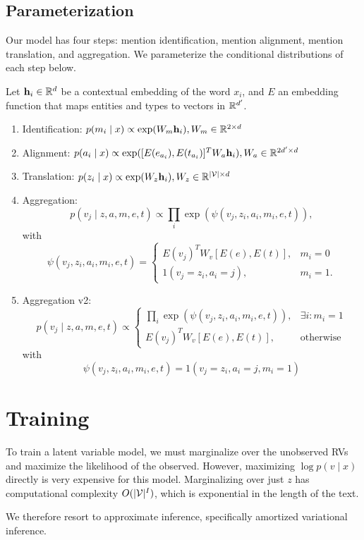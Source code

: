 \documentclass[12pt]{article}
\begin{document}
\subsection{Parameterization}
Our model has four steps: mention identification, mention alignment, 
mention translation, and aggregation.
We parameterize the conditional distributions of each step below.

Let $\mathbf{h}_i \in \mathbb{R}^d$ be a contextual embedding of the word $x_i$,
and $E$ an embedding function that maps entities and types
to vectors in $\mathbb{R}^{d'}$.
\begin{enumerate}
\item Identification: $p(m_i \mid x) \propto \exp(W_m\mathbf{h}_i), W_m \in \mathbb{R}^{2 \times d}$
\item Alignment: $p(a_i \mid x) \propto \exp([E(e_{a_i}), E(t_{a_i})]^TW_a \mathbf{h}_i),
W_a \in \mathbb{R}^{2d' \times d}$ 
\item Translation: $p(z_i \mid x) \propto \exp(W_z \mathbf{h}_i), W_z \in \mathbb{R}^{|\mathcal{V}| \times d}$
\item Aggregation: 
$$p(v_j \mid z,a,m,e,t) \propto \prod_i \exp(\psi(v_j, z_i, a_i, m_i,e,t)),$$
with
$$
\psi(v_j, z_i, a_i, m_i,e,t) = \begin{cases}
E(v_j)^TW_v [E(e),E(t)], & m_i = 0 \\
1(v_j = z_i, a_i = j), & m_i = 1.
\end{cases}
$$
\item Aggregation v2: 
$$p(v_j \mid z,a,m,e,t) \propto \begin{cases}
\prod_i \exp(\psi(v_j, z_i, a_i, m_i,e,t)), & \exists i: m_i = 1\\
E(v_j)^TW_v [E(e),E(t)], & \mathrm{otherwise}
\end{cases}
$$
with
$$
\psi(v_j, z_i, a_i, m_i,e,t) = 1(v_j = z_i, a_i = j, m_i=1)
$$
\end{enumerate}

\section{Training}
To train a latent variable model, we must marginalize over the unobserved RVs
and maximize the likelihood of the observed.
However, maximizing $\log p(v \mid x)$ directly is very expensive for this model.
Marginalizing over just $z$ has computational complexity $O(|\mathcal{V}|^{I})$, which is exponential in
the length of the text.

We therefore resort to approximate inference,
specifically amortized variational inference.
\end{document}
